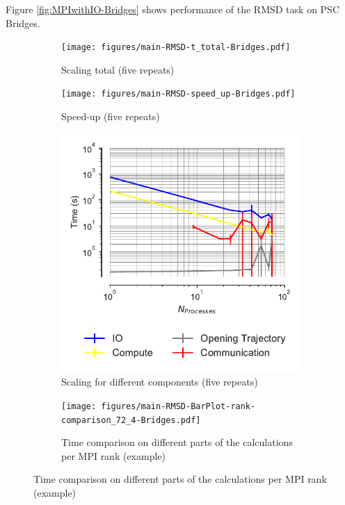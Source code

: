 \label{sec:supplement}

Figure \ref{fig:MPIwithIO-Bridges} shows performance of the RMSD task on PSC Bridges. 

\begin{figure}[ht!]
\centering
\begin{subfigure}{.4\textwidth}
  \texttt{[image: figures/main-RMSD-t\_total-Bridges.pdf]}
  \caption{Scaling total (five repeats)}
  \label{fig:MPIscaling-Bridges}
\end{subfigure}
\hfill
\begin{subfigure}{.4\textwidth}
  \texttt{[image: figures/main-RMSD-speed\_up-Bridges.pdf]}
  \caption{Speed-up (five repeats)}
  \label{fig:MPIspeedup-Bridges}
\end{subfigure}
\bigskip

\begin{subfigure}{.4\textwidth}
  \includegraphics[width=\linewidth]{figures/main-RMSD-time_comp_IO_comparison-Bridges.pdf}
  \captionsetup{format=hang}
\caption{Scaling for different components (five repeats)}
\label{fig:ScalingComputeIO-Bridges}
\end{subfigure}
\hfill
\begin{subfigure} {.5\textwidth}
  \texttt{[image: figures/main-RMSD-BarPlot-rank-comparison\_72\_4-Bridges.pdf]}
  \captionsetup{format=hang}
  \caption{Time comparison on different parts of the calculations per MPI rank (example)}
  \label{fig:MPIranks-Bridges}
\end{subfigure}


\end{figure}
